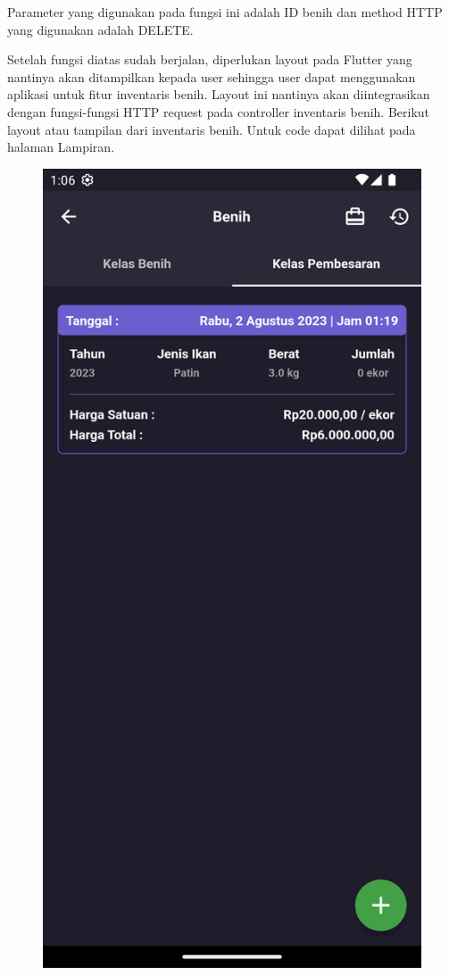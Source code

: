 \begin{spacing}{1.5}
\begin{enumerate}
		Parameter yang digunakan pada fungsi ini adalah ID benih dan method HTTP yang digunakan adalah DELETE.

		Setelah fungsi diatas sudah berjalan, diperlukan layout pada Flutter yang nantinya akan ditampilkan kepada user sehingga user dapat menggunakan aplikasi untuk fitur inventaris benih. Layout ini nantinya akan diintegrasikan dengan fungsi-fungsi HTTP request pada controller inventaris benih. Berikut layout atau tampilan dari inventaris benih. Untuk code dapat dilihat pada halaman Lampiran.

		\begin{figure}[H]
				\includegraphics[width=\linewidth]{gambar/sprint3/benih_1.png}

\end{figure}
\end{enumerate}
\end{spacing}
